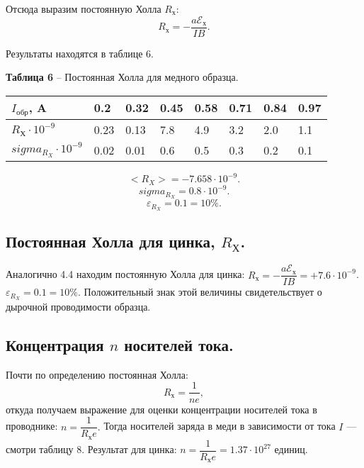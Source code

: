 \documentclass[12pt,a4paper]{article}
\begin{document}
        Отсюда выразим постоянную Холла $R_\text{х}$:
        \[
        R_\text{х} = - \dfrac{a\mathcal{E_\text{х}}}{IB}.
        \]
        
        Результаты находятся в таблице 6.
        \begin{table}[!h]
            \begin{flushleft}%
           		\textbf{Таблица 6} -- Постоянная Холла для медного образца.\\
            \end{flushleft}
            \begin{center}
                \begin{tabular}{ | l | l | l | l | l | l | l | l |}
                    \hline
                    $I_\text{обр}$, A                & 0.2   & 0.32  & 0.45  & 0.58  & 0.71  & 0.84  & 0.97   \\
                    \hline      
                    $R_\text{Х} \cdot 10^{-9}$  & 0.23  & 0.13  & 7.8   & 4.9   & 3.2   & 2.0   & 1.1   \\
                    \hline    
                    $sigma_{R_X} \cdot 10^{-9}$  & 0.02  & 0.01  & 0.6   & 0.5   & 0.3  & 0.2   & 0.1   \\
                    \hline    
                \end{tabular}
            \end{center}
        \end{table}
        
        \[
        <R_X> = -7.658 \cdot 10^{-9}.
        \]
        \[
        sigma_{R_X} = 0.8 \cdot 10^{-9}.
        \]
        \[
        \varepsilon_{R_X} = 0.1 = 10\%.
        \]
    \subsection{Постоянная Холла для цинка, $R_\text{Х}$.}
        Аналогично 4.4 находим постоянную Холла для цинка: $R_\text{х} = - \dfrac{a\mathcal{E_\text{х}}}{IB} = +7.6\cdot 10^{-9}$. $ \varepsilon_{R_X} = 0.1 = 10\%.$ Положительный знак этой величины свидетельствует о дырочной проводимости образца. 
        
    \subsection{Концентрация $n$ носителей тока.}
    Почти по определению постоянная Холла:
    \[
    R_\text{х} = \dfrac{1}{ne},
    \]
    откуда получаем выражение для оценки концентрации носителей тока в проводнике: $n = \dfrac{1}{R_\text{х}e}.$
    Тогда носителей заряда в меди в зависимости от тока $I$ --- смотри таблицу 8.
    Результат для цинка: $n = \dfrac{1}{R_\text{х}e} = 1.37\cdot 10^{27}$ единиц.
    
\end{document}
